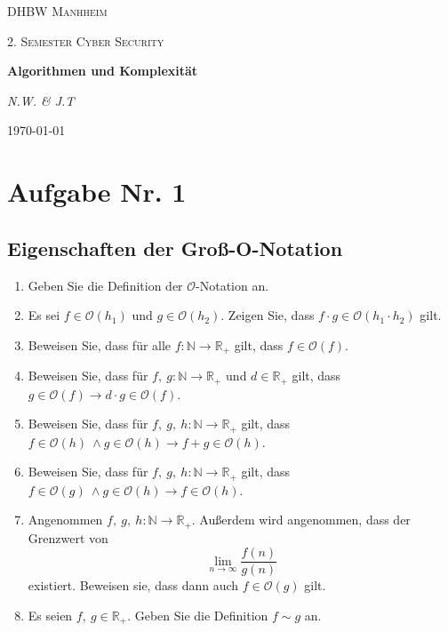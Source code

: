 \documentclass[12px,a4paper]{article}
\begin{document}
\begin{titlepage}
	\centering
	{\scshape\LARGE DHBW Manhheim \par}
	\vspace{1cm}
	{\scshape\Large 2. Semester Cyber Security\par}
	\vspace{1.5cm}
	{\huge\bfseries Algorithmen und Komplexität\par}
	\vspace{2cm}
	{\Large\itshape N.W. \& J.T\par}
	\vfill

	{\large \today\par} 
\end{titlepage}
\newpage
\justify

\section*{Aufgabe Nr. 1}
\subsection*{Eigenschaften der Groß-O-Notation}
\begin{enumerate}
	\item Geben Sie die Definition der $\mathcal{O}$-Notation an.
	\item Es sei $f \in \mathcal{O}(h_1)$ und $g \in \mathcal{O}(h_2)$. Zeigen Sie, dass $f \cdot g \in \mathcal{O}(h_1 \cdot h_2)$ gilt.
	\item Beweisen Sie, dass für alle $f: \mathbb{N} \rightarrow \mathbb{R}_+$ gilt, dass $f \in \mathcal{O}(f)$.
	\item Beweisen Sie, dass für $f, \: g: \mathbb{N} \rightarrow \mathbb{R}_+$ und $d \in \mathbb{R}_+$ gilt, dass \\ \noindent\hspace*{5mm} $g \in \mathcal{O}(f) \rightarrow d \cdot g \in \mathcal{O}(f)$.
	\item Beweisen Sie, dass für $f, \: g, \: h: \mathbb{N} \rightarrow \mathbb{R}_+$ gilt, dass \\ \noindent\hspace*{5mm} $f \in \mathcal{O}(h) \ \land g \in \mathcal{O}(h) \rightarrow f+g \in \mathcal{O}(h)$.
	\item Beweisen Sie, dass für $f, \: g, \: h: \mathbb{N} \rightarrow \mathbb{R}_+$ gilt, dass \\ \noindent\hspace*{5mm} $f \in \mathcal{O}(g) \ \land g \in \mathcal{O}(h) \rightarrow f \in \mathcal{O}(h)$.
	\item Angenommen $f, \: g, \: h: \mathbb{N} \rightarrow \mathbb{R}_+$. Außerdem wird angenommen, dass der Grenzwert von  \noindent\hspace*{5mm}  $$\lim\limits_{n \rightarrow \infty} \frac{f(n)}{g(n)}$$ existiert. Beweisen sie, dass dann auch $f \in \mathcal{O}(g)$ gilt.
	\item Es seien $f, \: g \in \mathbb{R}_+$. Geben Sie die Definition $f \sim g$ an.
\end{enumerate}
\end{document}

